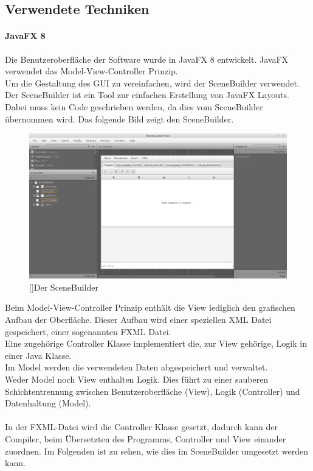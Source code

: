 \documentclass[12pt,a4paper, listof=entryprefix, bibliography=totocnumbered,toc=listofnumbered,lof=listofnumbered]{scrartcl}
\begin{document}
\subsection{Verwendete Techniken}
\paragraph{JavaFX 8}
Die Benutzeroberfläche der Software wurde in JavaFX 8 entwickelt. JavaFX verwendet das Model-View-Controller Prinzip.
\\
Um die Gestaltung des \gls{GUI} zu vereinfachen, wird der SceneBuilder verwendet. Der SceneBuilder ist ein Tool zur einfachen Erstellung von JavaFX Layouts. Dabei muss kein Code geschrieben werden, da dies vom SceneBuilder übernommen wird. Das folgende Bild zeigt den SceneBuilder.

\begin{figure}[H]
	\centering
	\includegraphics[width=1.0\linewidth]{Bilder/scenebuilder.png} 
	[]{Der SceneBuilder}
	\label{fig:osgi}
\end{figure}

Beim Model-View-Controller Prinzip enthält die View lediglich den grafischen Aufbau der Oberfläche. Dieser Aufbau wird einer speziellen \gls{XML} Datei gespeichert, einer sogenannten FXML Datei. 
\\
Eine zugehörige Controller Klasse implementiert die, zur View gehörige, Logik in einer Java Klasse. 
\\
Im Model werden die verwendeten Daten abgespeichert und verwaltet. 
\\
Weder Model noch View enthalten Logik. Dies führt zu einer sauberen Schichtentrennung zwischen Benutzeroberfläche (View), Logik (Controller) und Datenhaltung (Model).
\\
\\
In der FXML-Datei wird die Controller Klasse gesetzt, dadurch kann der Compiler, beim Übersetzten des Programms, Controller und View einander zuordnen. 
Im Folgenden ist zu sehen, wie dies im SceneBuilder umgesetzt werden kann.
\end{document}
